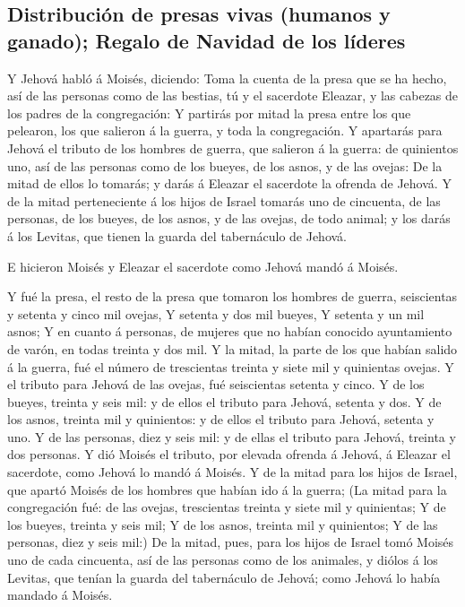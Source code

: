 \hypertarget{distribuciuxf3n-de-presas-vivas-humanos-y-ganado-regalo-de-navidad-de-los-luxedderes}{%
\subsection{Distribución de presas vivas (humanos y ganado); Regalo de
Navidad de los
líderes}\label{distribuciuxf3n-de-presas-vivas-humanos-y-ganado-regalo-de-navidad-de-los-luxedderes}}

 Y Jehová habló á Moisés, diciendo:  Toma
la cuenta de la presa que se ha hecho, así de las personas como de las
bestias, tú y el sacerdote Eleazar, y las cabezas de los padres de la
congregación:  Y partirás por mitad la presa entre los
que pelearon, los que salieron á la guerra, y toda la congregación.
 Y apartarás para Jehová el tributo de los hombres de
guerra, que salieron á la guerra: de quinientos uno, así de las personas
como de los bueyes, de los asnos, y de las ovejas:  De la
mitad de ellos lo tomarás; y darás á Eleazar el sacerdote la ofrenda de
Jehová.  Y de la mitad perteneciente á los hijos de
Israel tomarás uno de cincuenta, de las personas, de los bueyes, de los
asnos, y de las ovejas, de todo animal; y los darás á los Levitas, que
tienen la guarda del tabernáculo de Jehová.

 E hicieron Moisés y Eleazar el sacerdote como Jehová
mandó á Moisés.

 Y fué la presa, el resto de la presa que tomaron los
hombres de guerra, seiscientas y setenta y cinco mil ovejas,
 Y setenta y dos mil bueyes,  Y setenta y
un mil asnos;  Y en cuanto á personas, de mujeres que no
habían conocido ayuntamiento de varón, en todas treinta y dos mil.
 Y la mitad, la parte de los que habían salido á la
guerra, fué el número de trescientas treinta y siete mil y quinientas
ovejas.  Y el tributo para Jehová de las ovejas, fué
seiscientas setenta y cinco.  Y de los bueyes, treinta y
seis mil: y de ellos el tributo para Jehová, setenta y dos.
 Y de los asnos, treinta mil y quinientos: y de ellos el
tributo para Jehová, setenta y uno.  Y de las personas,
diez y seis mil: y de ellas el tributo para Jehová, treinta y dos
personas.  Y dió Moisés el tributo, por elevada ofrenda á
Jehová, á Eleazar el sacerdote, como Jehová lo mandó á Moisés.
 Y de la mitad para los hijos de Israel, que apartó
Moisés de los hombres que habían ido á la guerra;  (La
mitad para la congregación fué: de las ovejas, trescientas treinta y
siete mil y quinientas;  Y de los bueyes, treinta y seis
mil;  Y de los asnos, treinta mil y quinientos;
 Y de las personas, diez y seis mil:)  De
la mitad, pues, para los hijos de Israel tomó Moisés uno de cada
cincuenta, así de las personas como de los animales, y diólos á los
Levitas, que tenían la guarda del tabernáculo de Jehová; como Jehová lo
había mandado á Moisés.

